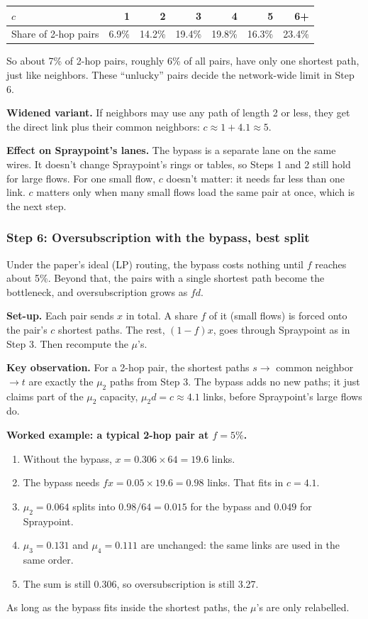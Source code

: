 \begin{center}
\begin{tabular}{@{}lrrrrrr@{}}
\toprule
$c$ & 1 & 2 & 3 & 4 & 5 & 6+ \\
\midrule
Share of 2-hop pairs & 6.9\% & 14.2\% & 19.4\% & 19.8\% & 16.3\% & 23.4\% \\
\bottomrule
\end{tabular}
\end{center}

So about 7\% of 2-hop pairs, roughly 6\% of all pairs, have only one shortest path, just like neighbors. These ``unlucky'' pairs decide the network-wide limit in Step 6.

\textbf{Widened variant.} If neighbors may use any path of length 2 or less, they get the direct link plus their common neighbors: $c \approx 1 + 4.1 \approx 5$.

\textbf{Effect on Spraypoint's lanes.} The bypass is a separate lane on the same wires. It doesn't change Spraypoint's rings or tables, so Steps 1 and 2 still hold for large flows. For one small flow, $c$ doesn't matter: it needs far less than one link. $c$ matters only when many small flows load the same pair at once, which is the next step.

\subsubsection{Step 6: Oversubscription with the bypass, best split}

Under the paper's ideal (LP) routing, the bypass costs nothing until $f$ reaches about 5\%. Beyond that, the pairs with a single shortest path become the bottleneck, and oversubscription grows as $f d$.

\textbf{Set-up.} Each pair sends $x$ in total. A share $f$ of it (small flows) is forced onto the pair's $c$ shortest paths. The rest, $(1 - f) x$, goes through Spraypoint as in Step 3. Then recompute the $\mu$'s.

\textbf{Key observation.} For a 2-hop pair, the shortest paths $s \to$ common neighbor $\to t$ are exactly the $\mu_2$ paths from Step 3. The bypass adds no new paths; it just claims part of the $\mu_2$ capacity, $\mu_2 d = c \approx 4.1$ links, before Spraypoint's large flows do.

\textbf{Worked example: a typical 2-hop pair at $f = 5\%$.}
\begin{enumerate}
  \item Without the bypass, $x = 0.306 \times 64 = 19.6$ links.
  \item The bypass needs $f x = 0.05 \times 19.6 = 0.98$ links. That fits in $c = 4.1$.
  \item $\mu_2 = 0.064$ splits into $0.98/64 = 0.015$ for the bypass and $0.049$ for Spraypoint.
  \item $\mu_3 = 0.131$ and $\mu_4 = 0.111$ are unchanged: the same links are used in the same order.
  \item The sum is still 0.306, so oversubscription is still 3.27.
\end{enumerate}
As long as the bypass fits inside the shortest paths, the $\mu$'s are only relabelled.

